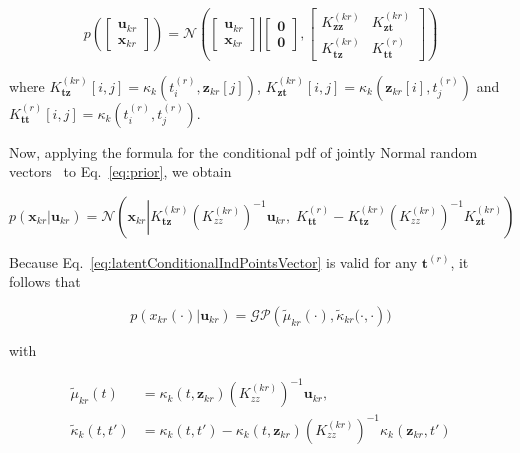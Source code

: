 \documentclass[12pt]{article}
\begin{document}
\begin{equation}
    p\left(\left[\begin{array}{c}
        \mathbf{u}_{kr}\\
        \mathbf{x}_{kr}
    \end{array}\right]\right)
    =\mathcal{N}\left(\left.\left[\begin{array}{c}
        \mathbf{u}_{kr}\\
        \mathbf{x}_{kr}
    \end{array}\right]\right|\left[\begin{array}{c}
        \mathbf{0}\\
        \mathbf{0}
    \end{array}\right],\left[\begin{array}{cc}
        K_\mathbf{zz}^{(kr)}&K_\mathbf{zt}^{(kr)}\\
        K_\mathbf{tz}^{(kr)}&K_\mathbf{tt}^{(r)}
    \end{array}\right]\right)
    \label{eq:prior}
\end{equation}

\noindent where
$K_\mathbf{tz}^{(kr)}[i,j]=\kappa_k(t^{(r)}_i,\mathbf{z}_{kr}[j])$,
$K_\mathbf{zt}^{(kr)}[i,j]=\kappa_k(\mathbf{z}_{kr}[i],t_j^{(r)})$
and
$K_\mathbf{tt}^{(r)}[i,j]=\kappa_k(t_i^{(r)},t_j^{(r)})$.

Now, applying the formula for the conditional pdf of jointly Normal random
vectors~\citep[][Eq. 2.116]{bishop06} to Eq.~\ref{eq:prior}, we obtain

\begin{equation}
    p(\mathbf{x}_{kr}|\mathbf{u}_{kr})=\mathcal{N}\left(\mathbf{x}_{kr}\left|K_\mathbf{tz}^{(kr)}\left(K_{zz}^{(kr)}\right)^{-1}\mathbf{u}_{kr},\;K_\mathbf{tt}^{(r)}-K_\mathbf{tz}^{(kr)}\left(K_{zz}^{(kr)}\right)^{-1}K_\mathbf{zt}^{(kr)}\right.\right)
    \label{eq:latentConditionalIndPointsVector}
\end{equation}

Because Eq.~\ref{eq:latentConditionalIndPointsVector} is valid for any
$\mathbf{t}^{(r)}$, it follows that

\begin{equation*}
    p(x_{kr}(\cdot)|\mathbf{u}_{kr})=\mathcal{GP}\left(\tilde{\mu}_{kr}(\cdot), \tilde{\kappa}_{kr}(\cdot,\cdot\right))
\end{equation*}

\noindent with

\begin{equation*}
    \begin{aligned}
        \tilde{\mu}_{kr}(t)&=\kappa_k(t,\mathbf{z}_{kr})\left(K_{zz}^{(kr)}\right)^{-1}\mathbf{u}_{kr},\\
        \tilde{\kappa}_k(t,t')&=\kappa_k(t,t')-\kappa_k(t,\mathbf{z}_{kr})\left(K_{zz}^{(kr)}\right)^{-1}\kappa_k(\mathbf{z}_{kr},t')
    \end{aligned}
\end{equation*}
\end{document}

